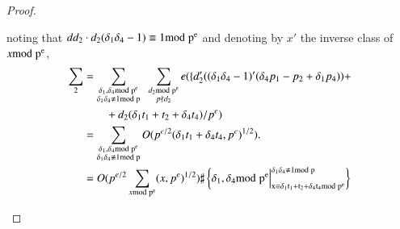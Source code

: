 \begin{proof}
\begin{itemize}
$$$$
noting that $dd_{2}\cdot d_{2}(\delta_{1}\delta_{4}-1)\equiv 1\rm{mod} \;
p^{e}$ and denoting by $x'$ the inverse class of $x\rm{mod} \; p^{e}$,
\begin{align*}
\sum_{2} &= \sum_{\substack{\delta_{1},\delta_{4}\rm{mod} \;
    p^{e}\\ \delta_{1}\delta_{4}\not\equiv 1\rm{mod} \;
    p}} \;\; \sum_{\substack{d_{2}\rm{mod} \; p^{e}\\ p\nmid
    d_{2}}}e(\{d'_{2}((\delta_{1}\delta_{4}-1)'(\delta_{4}p_{1}-p_{2}+\delta_{1}p_{4}))+\\
&\qquad +d_{2}(\delta_{1}t_{1}+t_{2}+\delta_{4}t_{4})/p^{e})\\
&= \sum\limits_{\substack{\delta_{1},\delta_{4}\rm{mod} \;
    p^{e}\\ \delta_{1}\delta_{4}\not\equiv 1\rm{mod} \;
    p}}O(p^{e/2}(\delta_{1}t_{1}+\delta_{4}t_{4},p^{e})^{1/2}).\\
&= O(p^{e/2}\sum_{x\rm{mod} \;
  p^{e}}(x,p^{e})^{1/2})\sharp\left\{\delta_{1},\delta_{4}\rm{mod} \;
p^{e}\Big|^{\delta_{1}\delta_{4}\not\equiv 1\rm{mod} \; p}_{x\equiv
  \delta_{1}t_{1}+t_{2}+\delta_{4}t_{4}\rm{mod} \; p^{e}}\right\}
\end{align*}
\end{itemize}
\end{proof}

